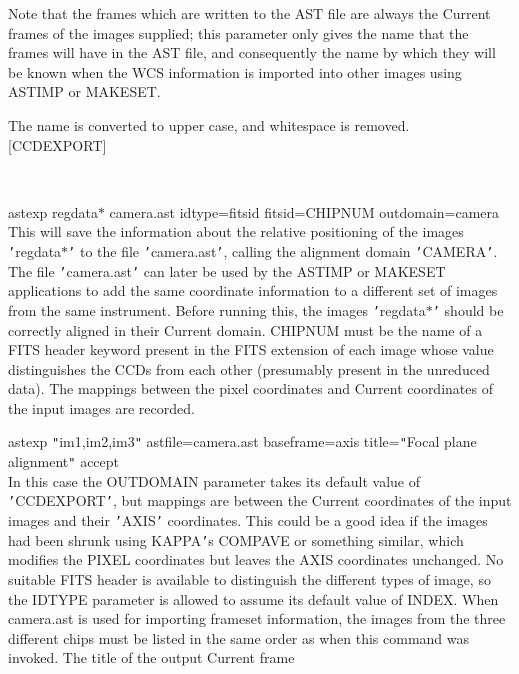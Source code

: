 \documentclass[twoside,11pt]{article}
\newcommand{\htmlref}[2]{#1}
\renewcommand{\_}{\texttt{\symbol{95}}}
\newcommand{\xroutine}[1]{\htmlref{{\sc #1}}{#1}}
\newcommand{\sstexamples}[1]{
   \item[Examples:] \mbox{} \\
   \vspace{-3.5ex}
   \begin{description}
      #1
   \end{description}
}
\newcommand{\sstexamplesubsection}[2]{\sloppy \item{\ssttt #1} \mbox{} \\ #2 }
\newcommand{\sstexamples}[1]{
      \item[Examples:] \\
      \begin{description}
         #1
      \end{description}
      \\
   }
\newcommand{\sstexamplesubsection}[2]{\item[{\ssttt #1}] #2}
\begin{document}
{{{         Note that the frames which are written to the AST file are
         always the Current frames of the images supplied; this
         parameter only gives the name that the frames will have in
         the AST file, and consequently the name by which they will be
         known when the WCS information is imported into other images
         using \xroutine{ASTIMP} or \xroutine{MAKESET}.

         The name is converted to upper case, and whitespace is removed.
         [CCD\_EXPORT]
      }
   }
   \sstexamples{
      \sstexamplesubsection{
         astexp reg\_data$*$ camera.ast idtype=fitsid fitsid=CHIPNUM
             outdomain=camera
      }{
         This will save the information about the relative positioning
         of the images {\tt '}reg\_data$*${\tt '} to the file {\tt '}camera.ast{\tt '}, calling the
         alignment domain {\tt '}CAMERA{\tt '}.  The file {\tt '}camera.ast{\tt '} can later be
         used by the \xroutine{ASTIMP} or \xroutine{MAKESET} applications to add the same coordinate
         information to a different set of images from the same instrument.
         Before running this, the images {\tt '}reg\_data$*${\tt '} should be correctly
         aligned in their Current domain.  CHIPNUM must be the name
         of a FITS header keyword present in the FITS extension of each
         image whose value distinguishes the CCDs from each other
         (presumably present in the unreduced data).  The mappings
         between the pixel coordinates and Current coordinates of the
         input images are recorded.
      }
      \sstexamplesubsection{
         astexp {\tt "}im1,im2,im3{\tt "} astfile=camera.ast baseframe=axis
             title={\tt "}Focal plane alignment{\tt "} accept
      }{
         In this case the OUTDOMAIN parameter takes its default value
         of {\tt '}CCD\_EXPORT{\tt '}, but mappings are between the Current
         coordinates of the input images and their {\tt '}AXIS{\tt '} coordinates.
         This could be a good idea if the images had been shrunk using
         KAPPA{\tt '}s COMPAVE or something similar, which modifies the
         PIXEL coordinates but leaves the AXIS coordinates unchanged.
         No suitable FITS header is available to distinguish the
         different types of image, so the IDTYPE parameter is allowed to
         assume its default value of INDEX.  When camera.ast is used
         for importing frameset information, the images from the three
         different chips must be listed in the same order as when this
         command was invoked.  The title of the output Current frame
}}}
\end{document}
